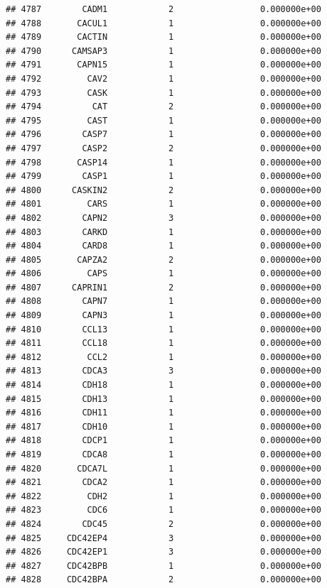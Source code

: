 \documentclass[
]{article}
\begin{document}
\begin{verbatim}
## 4787        CADM1            2                 0.000000e+00
## 4788       CACUL1            1                 0.000000e+00
## 4789       CACTIN            1                 0.000000e+00
## 4790      CAMSAP3            1                 0.000000e+00
## 4791       CAPN15            1                 0.000000e+00
## 4792         CAV2            1                 0.000000e+00
## 4793         CASK            1                 0.000000e+00
## 4794          CAT            2                 0.000000e+00
## 4795         CAST            1                 0.000000e+00
## 4796        CASP7            1                 0.000000e+00
## 4797        CASP2            2                 0.000000e+00
## 4798       CASP14            1                 0.000000e+00
## 4799        CASP1            1                 0.000000e+00
## 4800      CASKIN2            2                 0.000000e+00
## 4801         CARS            1                 0.000000e+00
## 4802        CAPN2            3                 0.000000e+00
## 4803        CARKD            1                 0.000000e+00
## 4804        CARD8            1                 0.000000e+00
## 4805       CAPZA2            2                 0.000000e+00
## 4806         CAPS            1                 0.000000e+00
## 4807      CAPRIN1            2                 0.000000e+00
## 4808        CAPN7            1                 0.000000e+00
## 4809        CAPN3            1                 0.000000e+00
## 4810        CCL13            1                 0.000000e+00
## 4811        CCL18            1                 0.000000e+00
## 4812         CCL2            1                 0.000000e+00
## 4813        CDCA3            3                 0.000000e+00
## 4814        CDH18            1                 0.000000e+00
## 4815        CDH13            1                 0.000000e+00
## 4816        CDH11            1                 0.000000e+00
## 4817        CDH10            1                 0.000000e+00
## 4818        CDCP1            1                 0.000000e+00
## 4819        CDCA8            1                 0.000000e+00
## 4820       CDCA7L            1                 0.000000e+00
## 4821        CDCA2            1                 0.000000e+00
## 4822         CDH2            1                 0.000000e+00
## 4823         CDC6            1                 0.000000e+00
## 4824        CDC45            2                 0.000000e+00
## 4825     CDC42EP4            3                 0.000000e+00
## 4826     CDC42EP1            3                 0.000000e+00
## 4827     CDC42BPB            1                 0.000000e+00
## 4828     CDC42BPA            2                 0.000000e+00

\end{verbatim}
\end{document}
